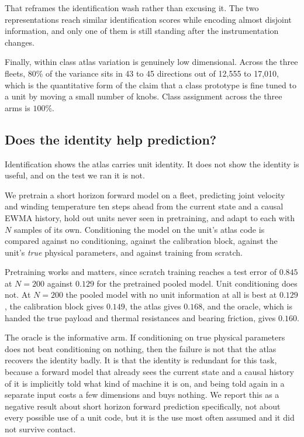 \documentclass[11pt]{article}
\begin{document}
That reframes the identification wash rather than excusing it. The two
representations reach similar identification scores while encoding almost
disjoint information, and only one of them is still standing after the
instrumentation changes.

Finally, within class atlas variation is genuinely low dimensional. Across the
three fleets, 80\% of the variance sits in 43 to 45 directions out of 12{,}555
to 17{,}010, which is the quantitative form of the claim that a class prototype
is fine tuned to a unit by moving a small number of knobs. Class assignment
across the three arms is $100\%$.

\subsection{Does the identity help prediction?}

Identification shows the atlas carries unit identity. It does not show the
identity is useful, and on the test we ran it is not.

We pretrain a short horizon forward model on a fleet, predicting joint velocity
and winding temperature ten steps ahead from the current state and a causal
EWMA history, hold out units never seen in pretraining, and adapt to each with
$N$ samples of its own. Conditioning the model on the unit's atlas code is
compared against no conditioning, against the calibration block, against the
unit's \emph{true} physical parameters, and against training from scratch.

Pretraining works and matters, since scratch training reaches a test error of
$0.845$ at $N=200$ against $0.129$ for the pretrained pooled model. Unit
conditioning does not. At $N=200$ the pooled model with no unit information at
all is best at $0.129$, the calibration block gives $0.149$, the atlas gives
$0.168$, and the oracle, which is handed the true payload and thermal
resistances and bearing friction, gives $0.160$.

The oracle is the informative arm. If conditioning on true physical parameters
does not beat conditioning on nothing, then the failure is not that the atlas
recovers the identity badly. It is that the identity is redundant for this
task, because a forward model that already sees the current state and a causal
history of it is implicitly told what kind of machine it is on, and being told
again in a separate input costs a few dimensions and buys nothing. We report
this as a negative result about short horizon forward prediction specifically,
not about every possible use of a unit code, but it is the use most often
assumed and it did not survive contact.
\end{document}
